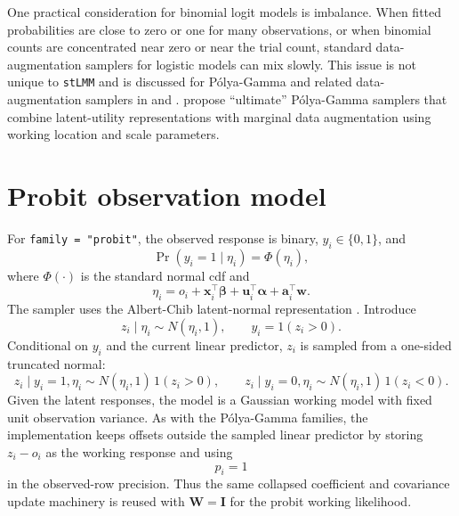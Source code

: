\documentclass[11pt]{article}
\newcommand{\bw}{\bm{w}}
\newcommand{\balpha}{\bm{\alpha}}
\newcommand{\bbeta}{\bm{\beta}}
\newcommand{\bu}{\bm{u}}
\newcommand{\ba}{\bm{a}}
\newcommand{\bx}{\bm{x}}
\newcommand{\bI}{\bm{I}}
\newcommand{\bW}{\bm{W}}
\newcommand{\trans}{^\top}
\begin{document}
One practical consideration for binomial logit models is imbalance. When fitted probabilities are close to zero or one for many observations, or when binomial counts are concentrated near zero or near the trial count, standard data-augmentation samplers for logistic models can mix slowly. This issue is not unique to \texttt{stLMM} and is discussed for P{\'o}lya-Gamma and related data-augmentation samplers in \cite{Johndrow2019} and \cite{Zens2024}. \cite{Zens2024} propose ``ultimate'' P{\'o}lya-Gamma samplers that combine latent-utility representations with marginal data augmentation using working location and scale parameters.

\section{Probit observation model}\label{sec:probit}

For \texttt{family = "probit"}, the observed response is binary, $y_i\in\{0,1\}$, and
\begin{equation}
  \Pr(y_i=1\mid\eta_i)=\Phi(\eta_i),
\end{equation}
where $\Phi(\cdot)$ is the standard normal cdf and
\begin{equation}
  \eta_i = o_i + \bx_i\trans \bbeta + \bu_i\trans \balpha
    + \ba_i\trans \bw .
\end{equation}
The sampler uses the Albert-Chib latent-normal representation \citep{AlbertChib1993}. Introduce
\begin{equation}
  z_i \mid \eta_i \sim N(\eta_i,1),
  \qquad
  y_i = 1(z_i > 0).
\end{equation}
Conditional on $y_i$ and the current linear predictor, $z_i$ is sampled from a one-sided truncated normal:
\begin{equation}
  z_i \mid y_i=1,\eta_i \sim N(\eta_i,1)\,1(z_i>0),
  \qquad
  z_i \mid y_i=0,\eta_i \sim N(\eta_i,1)\,1(z_i<0).
\end{equation}
Given the latent responses, the model is a Gaussian working model with fixed unit observation variance. As with the P{\'o}lya-Gamma families, the implementation keeps offsets outside the sampled linear predictor by storing $z_i-o_i$ as the working response and using
\begin{equation}
  p_i = 1
\end{equation}
in the observed-row precision. Thus the same collapsed coefficient and covariance update machinery is reused with $\bW=\bI$ for the probit working likelihood.
\end{document}
